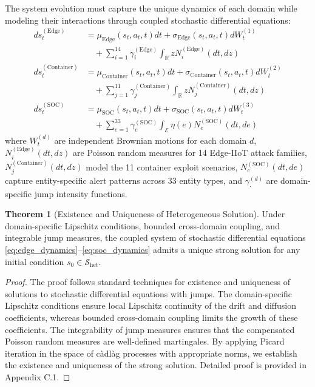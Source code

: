 \documentclass[12pt,a4paper]{article}
\theoremstyle{definition}
\newtheorem{theorem}{Theorem}[section]
\newcommand{\R}{\mathbb{R}}
\renewcommand{\S}{\mathcal{S}}
\begin{document}
The system evolution must capture the unique dynamics of each domain while modeling their interactions through coupled stochastic differential equations:
\begin{align}
ds_t^{(\text{Edge})} &= \mu_{\text{Edge}}(s_t, a_t, t)dt + \sigma_{\text{Edge}}(s_t, a_t, t)dW_t^{(1)} \nonumber \\
&\quad + \sum_{i=1}^{14} \gamma_i^{(\text{Edge})} \int_{\R} z N_i^{(\text{Edge})}(dt, dz) \label{eq:edge_dynamics} \\
ds_t^{(\text{Container})} &= \mu_{\text{Container}}(s_t, a_t, t)dt + \sigma_{\text{Container}}(s_t, a_t, t)dW_t^{(2)} \nonumber \\
&\quad + \sum_{j=1}^{11} \gamma_j^{(\text{Container})} \int_{\R} z N_j^{(\text{Container})}(dt, dz) \label{eq:container_dynamics} \\
ds_t^{(\text{SOC})} &= \mu_{\text{SOC}}(s_t, a_t, t)dt + \sigma_{\text{SOC}}(s_t, a_t, t)dW_t^{(3)} \nonumber \\
&\quad + \sum_{e=1}^{33} \gamma_e^{(\text{SOC})} \int_{\mathcal{E}} \eta(e) N_e^{(\text{SOC})}(dt, de) \label{eq:soc_dynamics}
\end{align}
where $W_t^{(d)}$ are independent Brownian motions for each domain $d$, $N_i^{(\text{Edge})}(dt, dz)$ are Poisson random measures for 14 Edge-IIoT attack families, $N_j^{(\text{Container})}(dt, dz)$ model the 11 container exploit scenarios, $N_e^{(\text{SOC})}(dt, de)$ capture entity-specific alert patterns across 33 entity types, and $\gamma_{\cdot}^{(d)}$ are domain-specific jump intensity functions.

\begin{theorem}[Existence and Uniqueness of Heterogeneous Solution]
\label{thm:existence_uniqueness}
Under domain-specific Lipschitz conditions, bounded cross-domain coupling, and integrable jump measures, the coupled system of stochastic differential equations \eqref{eq:edge_dynamics}--\eqref{eq:soc_dynamics} admits a unique strong solution for any initial condition $s_0 \in \S_{\text{het}}$.
\end{theorem}

\begin{proof}
The proof follows standard techniques for existence and uniqueness of solutions to stochastic differential equations with jumps. The domain-specific Lipschitz conditions ensure local Lipschitz continuity of the drift and diffusion coefficients, whereas bounded cross-domain coupling limits the growth of these coefficients. The integrability of jump measures ensures that the compensated Poisson random measures are well-defined martingales. By applying Picard iteration in the space of càdlàg processes with appropriate norms, we establish the existence and uniqueness of the strong solution. Detailed proof is provided in Appendix C.1.
\end{proof}
\end{document}
